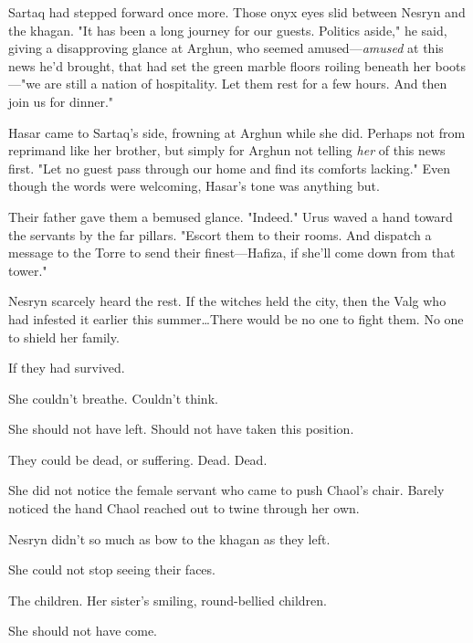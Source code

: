 Sartaq had stepped forward once more. Those onyx eyes slid between Nesryn and the khagan. "It has been a long journey for our guests. Politics aside," he said, giving a disapproving glance at Arghun, who seemed amused---\emph{amused} at this news he'd brought, that had set the green marble floors roiling beneath her boots---"we are still a nation of hospitality. Let them rest for a few hours. And then join us for dinner."

Hasar came to Sartaq's side, frowning at Arghun while she did. Perhaps not from reprimand like her brother, but simply for Arghun not telling \emph{her} of this news first. "Let no guest pass through our home and find its comforts lacking." Even though the words were welcoming, Hasar's tone was anything but.

Their father gave them a bemused glance. "Indeed." Urus waved a hand toward the servants by the far pillars. "Escort them to their rooms. And dispatch a message to the Torre to send their finest---Hafiza, if she'll come down from that tower."

Nesryn scarcely heard the rest. If the witches held the city, then the Valg who had infested it earlier this summer\ldots There would be no one to fight them. No one to shield her family.

If they had survived.

She couldn't breathe. Couldn't think.

She should not have left. Should not have taken this position.

They could be dead, or suffering. Dead. Dead.

She did not notice the female servant who came to push Chaol's chair. Barely noticed the hand Chaol reached out to twine through her own.

Nesryn didn't so much as bow to the khagan as they left.

She could not stop seeing their faces.

The children. Her sister's smiling, round-bellied children.

She should not have come.

